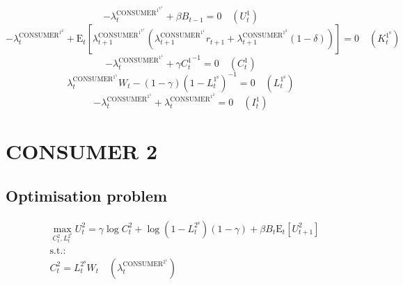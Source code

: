 \begin{equation}
-\lambda^{\mathrm{CONSUMER}^{\mathrm{1}^{\mathrm{U}^{\mathrm{1}}}}}_{t} + {\beta} {B_{t-1}} = 0
 \quad \left(U^{\mathrm{1}}_{t}\right)
\end{equation}
\begin{equation}
-\lambda^{\mathrm{CONSUMER}^{\mathrm{1}^{\mathrm{2}}}}_{t} + \mathrm{E}_{t}\left[{\lambda^{\mathrm{CONSUMER}^{\mathrm{1}^{\mathrm{U}^{\mathrm{1}}}}}_{t+1}} \left({\lambda^{\mathrm{CONSUMER}^{\mathrm{1}^{\mathrm{1}}}}_{t+1}} {r_{t+1}} + {\lambda^{\mathrm{CONSUMER}^{\mathrm{1}^{\mathrm{2}}}}_{t+1}} \left(1 - \delta\right)\right)\right] = 0
 \quad \left(K^{\mathrm{1}^{\mathrm{s}}}_{t}\right)
\end{equation}
\begin{equation}
-\lambda^{\mathrm{CONSUMER}^{\mathrm{1}^{\mathrm{1}}}}_{t} + {\gamma} {C^{\mathrm{1}}_{t}}^{-1} = 0
 \quad \left(C^{\mathrm{1}}_{t}\right)
\end{equation}
\begin{equation}
{\lambda^{\mathrm{CONSUMER}^{\mathrm{1}^{\mathrm{1}}}}_{t}} {W_{t}} - \left(1 - \gamma\right) \left(1 - L^{\mathrm{1}^{\mathrm{s}}}_{t}\right)^{-1} = 0
 \quad \left(L^{\mathrm{1}^{\mathrm{s}}}_{t}\right)
\end{equation}
\begin{equation}
-\lambda^{\mathrm{CONSUMER}^{\mathrm{1}^{\mathrm{1}}}}_{t} + \lambda^{\mathrm{CONSUMER}^{\mathrm{1}^{\mathrm{2}}}}_{t} = 0
 \quad \left(I^{\mathrm{1}}_{t}\right)
\end{equation}




\section{CONSUMER 2}

\subsection{Optimisation problem}

\begin{align}
&\max_{C^{\mathrm{2}}_{t}, L^{\mathrm{2}^{\mathrm{s}}}_{t}
} U^{\mathrm{2}}_{t} = {\gamma} {\log{C^{\mathrm{2}}_{t}}} + {\log\left(1 - L^{\mathrm{2}^{\mathrm{s}}}_{t}\right)} \left(1 - \gamma\right) + {\beta} {B_{t}} {\mathrm{E}_{t}\left[U^{\mathrm{2}}_{t+1}\right]}\\
&\mathrm{s.t.:}\nonumber\\
& C^{\mathrm{2}}_{t} = {L^{\mathrm{2}^{\mathrm{s}}}_{t}} {W_{t}} \quad \left(\lambda^{\mathrm{CONSUMER}^{\mathrm{2}^{\mathrm{1}}}}_{t}\right)
\end{align}


